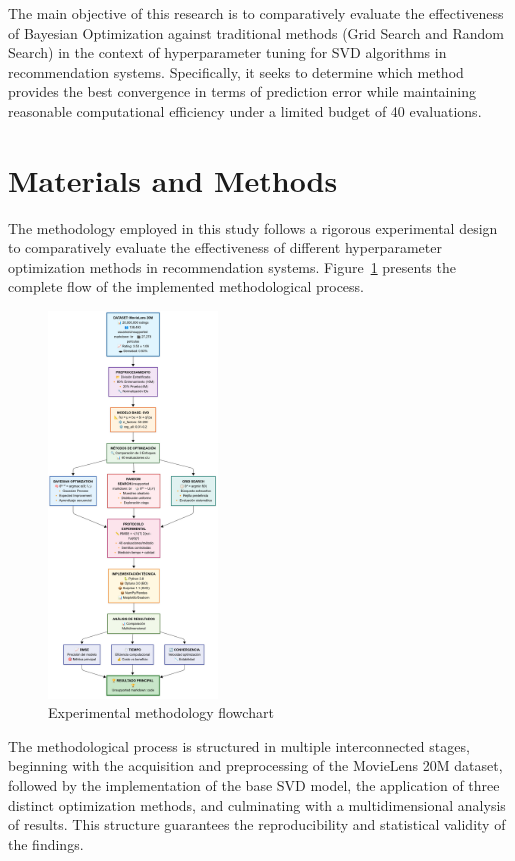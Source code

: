 \documentclass[conference]{IEEEtran}
\begin{document}
The main objective of this research is to comparatively evaluate the effectiveness of Bayesian Optimization against traditional methods (Grid Search and Random Search) in the context of hyperparameter tuning for SVD algorithms in recommendation systems. Specifically, it seeks to determine which method provides the best convergence in terms of prediction error while maintaining reasonable computational efficiency under a limited budget of 40 evaluations.

\section{Materials and Methods}

The methodology employed in this study follows a rigorous experimental design to comparatively evaluate the effectiveness of different hyperparameter optimization methods in recommendation systems. Figure~\ref{fig:metodologia} presents the complete flow of the implemented methodological process.

\begin{figure}[htbp]
  \centering
  \includegraphics[width=0.4\textwidth]{Diagrama.png}
  \caption{Experimental methodology flowchart}
  \label{fig:metodologia}
\end{figure}

The methodological process is structured in multiple interconnected stages, beginning with the acquisition and preprocessing of the MovieLens 20M dataset, followed by the implementation of the base SVD model, the application of three distinct optimization methods, and culminating with a multidimensional analysis of results. This structure guarantees the reproducibility and statistical validity of the findings.
\end{document}
